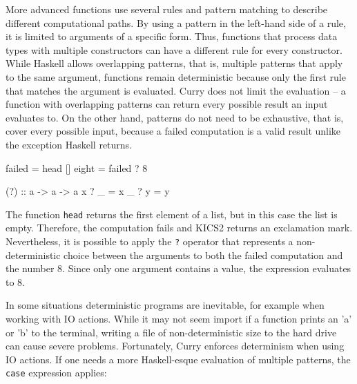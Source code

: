 \documentclass[paper = a4, fleqn, abstract=on, twoside]{scrreprt}
\begin{document}
\noindent
More advanced functions use several rules and pattern matching to describe different computational paths. By using a pattern in the left-hand side of a rule, it is limited to arguments of a specific form. Thus, functions that process data types with multiple constructors can have a different rule for every constructor. While Haskell allows overlapping patterns, that is, multiple patterns that apply to the same argument, functions remain deterministic because only the first rule that matches the argument is evaluated. Curry does not limit the evaluation -- a function with overlapping patterns can return every possible result an input evaluates to. On the other hand, patterns do not need to be exhaustive, that is, cover every possible input, because a failed computation is a valid result unlike the exception Haskell returns.
\begin{flushleft}
	\begin{minipage}[t]{.3 \linewidth}
\begin{haskellcode}
failed = head []
eight = failed ? 8
\end{haskellcode}
\end{minipage}
\hfill
\vrule
\hfill
\begin{minipage}[t]{.65 \linewidth}
\begin{haskellcode}
(?) :: a -> a -> a
x ? _ = x
_ ? y = y
\end{haskellcode}
\end{minipage}
\end{flushleft}
\noindent
The function \texttt{head} returns the first element of a list, but in this case the list is empty. Therefore, the computation fails and KICS2 returns an exclamation mark. Nevertheless, it is possible to apply the \texttt{?} operator that represents a non-deterministic choice between the arguments to both the failed computation and the number 8. Since only one argument contains a value, the expression evaluates to 8.
\par
In some situations deterministic programs are inevitable, for example when working with IO actions. While it may not seem import if a function prints an 'a' or 'b' to the terminal, writing a file of non-deterministic size to the hard drive can cause severe problems. Fortunately, Curry enforces determinism when using IO actions. If one needs a more Haskell-esque evaluation of multiple patterns, the \texttt{case} expression applies:
\end{document}
